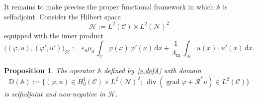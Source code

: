 \documentclass[10pt]{amsart}
\newtheorem{prop}[cdrthm]{Proposition}
\theoremstyle{definition}
\DeclareMathOperator{\Div}{div}
\DeclareMathOperator{\grad}{grad}
\newcommand{\epsl}{\varepsilon}
\newcommand{\calC}{\mathcal{C}}
\newcommand{\calH}{\mathcal{H}}
\newcommand{\calN}{\mathcal{N}}
\newcommand{\calR}{\mathcal{R}}
\newcommand{\bbA}{\mathbb{A}}
\newcommand{\rmd}{{\mathrm{d}}}
\newcommand{\rmD}{{\mathrm{D}}}
\newcommand{\Lm}{{\Lambda_{\mathrm{m}}}}
\begin{document}
It remains to make precise the proper functional framework in which $\bbA$ is selfadjoint. Consider the Hilbert space
\[
\calH := L^2(\calC) \times L^2(\calN)^2
\]
equipped with the inner product
\begin{equation}\label{e.def-inner-prod}
\Big((\varphi,u), (\varphi',u') \Big)_\calH :=
\epsl_0 \mu_0 \, \int_\calC \varphi(x) \, \overline{\varphi'(x)} \,\rmd x + \frac{1}{\Lm} \, \int_\calN u(x) \cdot \overline{u'(x)} \,\rmd x.
\end{equation}

\begin{prop}
The operator $\bbA$ defined by~\eqref{e.defA} with domain
\begin{equation}\label{e.def-Dom-A}
\rmD(\bbA) := \Big\{ (\varphi,u) \in H^1_0(\calC) \times L^2(\calN)^2; \
\Div(\grad \varphi + \calR^* u) \in L^2(\calC) \Big\}
\end{equation}
is selfadjoint and non-negative in $\calH$.\label{p.A-selfadjoint}
\end{prop}
\end{document}

